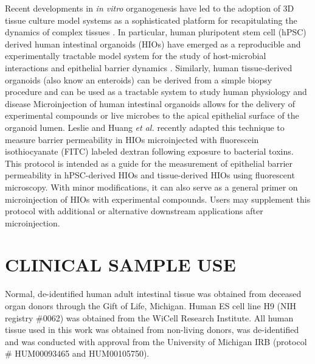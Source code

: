 \documentclass[11pt]{article}
\begin{document}
Recent developments in \emph{in vitro} organogenesis have led to the adoption of 3D tissue culture model systems as a sophisticated platform for recapitulating the dynamics of complex tissues \supercite{Sato:2009,Clevers:2016,Drost:2016,Rookmaaker:2015,Spence:2011,Aurora:2016,Dedhia:2016,Dye:2015,Dye:2016}. In particular, human pluripotent stem cell (hPSC) derived human intestinal organoids (HIOs) \supercite{Spence:2011,McCracken:2011} have emerged as a reproducible and experimentally tractable model system for the study of host-microbial interactions and epithelial barrier dynamics \supercite{Leslie:2015,Leslie:2016,Zachos:2016, Hill:2017}. Similarly, human tissue-derived organoids (also know an enteroids) can be derived from a simple biopsy procedure and can be used as a tractable system to study human physiology and disease \supercite{Sato:2009,Miyoshi:2013,Sato:2011} Microinjection of human intestinal organoids allows for the delivery of experimental compounds \supercite{Leslie:2015} or live microbes \supercite{Engevik:2013, Leslie:2015,Forbester:2015,Engevik:2015} to the apical epithelial surface of the organoid lumen. Leslie and Huang \emph{et al.}\supercite{Leslie:2015} recently adapted this technique to measure barrier permeability in HIOs microinjected with fluorescein isothiocyanate (FITC) labeled dextran following exposure to bacterial toxins.\\

This protocol is intended as a guide for the measurement of epithelial barrier permeability in hPSC-derived HIOs and tissue-derived HIOs using fluorescent microscopy. With minor modifications, it can also serve as a general primer on microinjection of HIOs with experimental compounds. Users may supplement this protocol with additional or alternative downstream applications after microinjection.\\

\section*{CLINICAL SAMPLE USE}
Normal, de-identified human adult intestinal tissue was obtained from deceased organ donors through the Gift of Life, Michigan. Human ES cell line H9 (NIH registry \#0062) was obtained from the WiCell Research Institute. All human tissue used in this work was obtained from non-living donors, was de-identified and was conducted with approval from the University of Michigan IRB (protocol \# HUM00093465 and HUM00105750).\\
\end{document}
